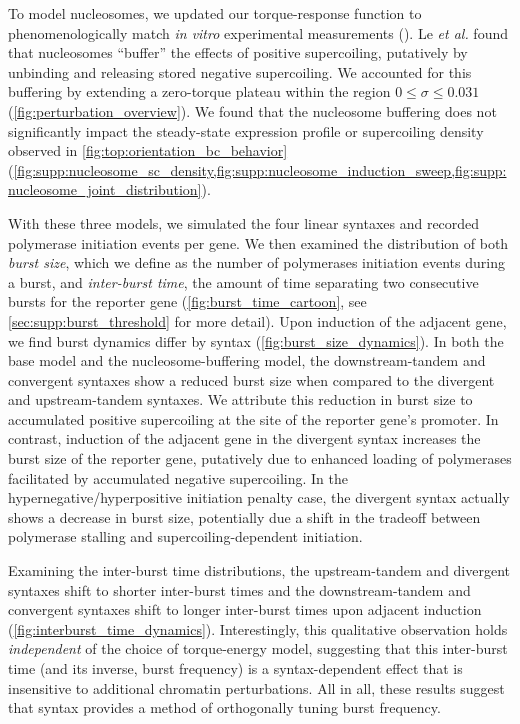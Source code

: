 \documentclass[11pt]{article}
\begin{document}
To model nucleosomes, we updated our torque-response function to phenomenologically match \textit{in vitro} experimental measurements (\textcite{leSynergisticCoordinationChromatin2019}). Le \textit{et al.} found that nucleosomes ``buffer'' the effects of positive supercoiling, putatively by unbinding and releasing stored negative supercoiling. We accounted for this buffering by extending a zero-torque plateau within the region \(0 \leq \sigma \leq 0.031\) (\cref{fig:perturbation_overview}). We found that the nucleosome buffering does not significantly impact the steady-state expression profile or supercoiling density observed in \cref{fig:top:orientation_bc_behavior} (\cref{fig:supp:nucleosome_sc_density,fig:supp:nucleosome_induction_sweep,fig:supp:nucleosome_joint_distribution}).


With these three models, we simulated the four linear syntaxes and recorded polymerase initiation events per gene. We then examined the distribution of both \emph{burst size}, which we define as the number of polymerases initiation events during a burst, and \emph{inter-burst time}, the amount of time separating two consecutive bursts for the reporter gene (\cref{fig:burst_time_cartoon}, see \cref{sec:supp:burst_threshold} for more detail). Upon induction of the adjacent gene, we find burst dynamics differ by syntax (\cref{fig:burst_size_dynamics}). In both the base model and the nucleosome-buffering model, the downstream-tandem and convergent syntaxes show a reduced burst size when compared to the divergent and upstream-tandem syntaxes. We attribute this reduction in burst size to accumulated positive supercoiling at the site of the reporter gene's promoter. In contrast, induction of the adjacent gene in the divergent syntax increases the burst size of the reporter gene, putatively due to enhanced loading of polymerases facilitated by accumulated negative supercoiling. In the hypernegative/hyperpositive initiation penalty case, the divergent syntax actually shows a decrease in burst size, potentially due a shift in the tradeoff between polymerase stalling and supercoiling-dependent initiation. 

Examining the inter-burst time distributions, the upstream-tandem and divergent syntaxes shift to shorter inter-burst times and the downstream-tandem and convergent syntaxes shift to longer inter-burst times upon adjacent induction (\cref{fig:interburst_time_dynamics}). Interestingly, this qualitative observation holds \emph{independent} of the choice of torque-energy model, suggesting that this inter-burst time (and its inverse, burst frequency) is a syntax-dependent effect that is insensitive to additional chromatin perturbations. All in all, these results suggest that syntax provides a method of orthogonally tuning burst frequency.
\end{document}
